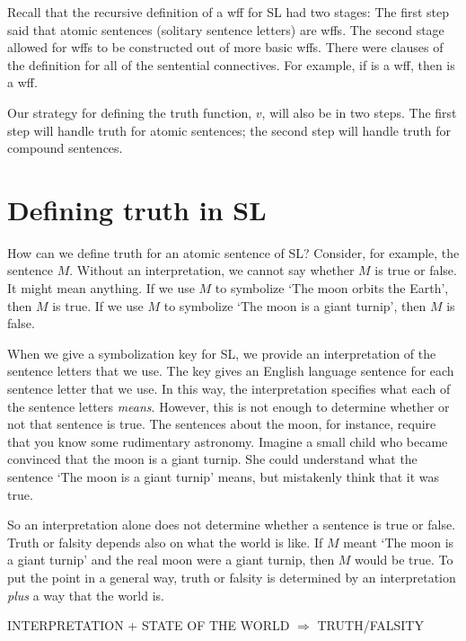 Recall that the recursive definition of a wff for SL had two stages: The first step said that atomic sentences (solitary sentence letters) are wffs. The second stage allowed for wffs to be constructed out of more basic wffs. There were clauses of the definition for all of the sentential connectives. For example, if \metaA{} is a wff, then \enot\metaA{} is a wff.

Our strategy for defining the truth function, $v$, will also be in two steps. The first step will handle truth for atomic sentences; the second step will handle truth for compound sentences.


\section{Defining truth in SL}
How can we define truth for an atomic sentence of SL? Consider, for example, the sentence $M$. Without an interpretation, we cannot say whether $M$ is true or false. It might mean anything. If we use $M$ to symbolize `The moon orbits the Earth', then $M$ is true. If we use $M$ to symbolize `The moon is a giant turnip', then $M$ is false.

When we give a symbolization key for SL, we provide an {interpretation} of the sentence letters that we use. The key gives an English language sentence for each sentence letter that we use. In this way, the interpretation specifies what each of the sentence letters \emph{means}. However, this is not enough to determine whether or not that sentence is true. The sentences about the moon, for instance, require that you know some rudimentary astronomy. Imagine a small child who became convinced that the moon is a giant turnip. She could understand what the sentence `The moon is a giant turnip' means, but mistakenly think that it was true.

So an interpretation alone does not determine whether a sentence is true or false. Truth or falsity depends also on what the world is like. If $M$ meant `The moon is a giant turnip' and the real moon were a giant turnip, then $M$ would be true. To put the point in a general way, truth or falsity is determined by an interpretation \emph{plus} a way that the world is.

\begin{center}
INTERPRETATION + STATE OF THE WORLD $\Longrightarrow$ TRUTH/FALSITY
\end{center}


